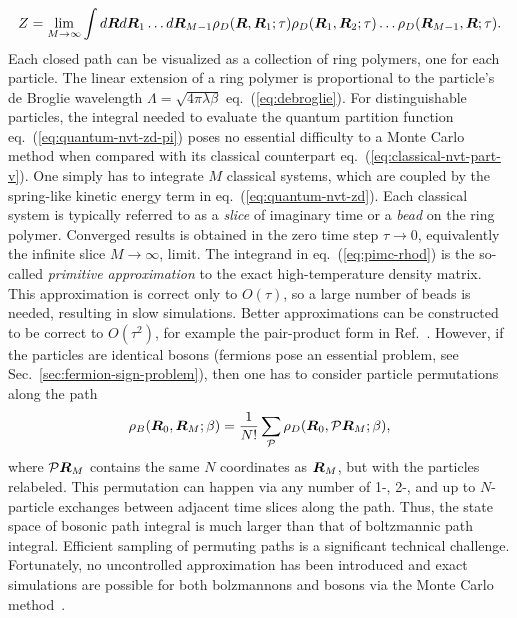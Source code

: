 \begin{align} \label{eq:quantum-nvt-zd-pi}
Z=\lim\limits_{M\rightarrow\infty} \int d\boldsymbol{R} d\boldsymbol{R}_1\dots d\boldsymbol{R}_{M-1}
\rho_D(\boldsymbol{R},\boldsymbol{R}_1;\tau)\rho_D(\boldsymbol{R}_1,\boldsymbol{R}_2;\tau)\dots\rho_D(\boldsymbol{R}_{M-1},\boldsymbol{R};\tau).
\end{align}
Each closed path can be visualized as a collection of ring polymers, one for each particle. The linear extension of a ring polymer is proportional to the particle's de Broglie wavelength $\Lambda=\sqrt{4\pi\lambda\beta}$ eq.~(\ref{eq:debroglie}).
For distinguishable particles, the integral needed to evaluate the quantum partition function eq.~(\ref{eq:quantum-nvt-zd-pi}) poses no essential difficulty to a Monte Carlo method when compared with its classical counterpart eq.~(\ref{eq:classical-nvt-part-v}).
One simply has to integrate $M$ classical systems, which are coupled by the spring-like kinetic energy term in eq.~(\ref{eq:quantum-nvt-zd}).
Each classical system is typically referred to as a \emph{slice} of imaginary time or a \emph{bead} on the ring polymer.
Converged results is obtained in the zero time step $\tau\rightarrow0$, equivalently the infinite slice $M\rightarrow\infty$, limit.
The integrand in eq.~(\ref{eq:pimc-rhod}) is the so-called \emph{primitive approximation} to the exact high-temperature density matrix.
This approximation is correct only to $O(\tau)$, so a large number of beads is needed, resulting in slow simulations.
Better approximations can be constructed to be correct to $O(\tau^2)$, for example the pair-product form in Ref.~\cite{Ceperley1995}.
However, if the particles are identical bosons (fermions pose an essential problem, see Sec.~\ref{sec:fermion-sign-problem}), then one has to consider particle permutations along the path
\begin{align}
\rho_B(\boldsymbol{R}_0,\boldsymbol{R}_M;\beta) = \frac{1}{N!}\sum\limits_{\mathcal{P}} \rho_D(\boldsymbol{R}_0, \mathcal{P}\boldsymbol{R}_M;\beta),
\end{align}
where $\mathcal{P}\boldsymbol{R}_M$ contains the same $N$ coordinates as $\boldsymbol{R}_M$, but with the particles relabeled. This permutation can happen via any number of 1-, 2-, and up to $N$-particle exchanges between adjacent time slices along the path. Thus, the state space of bosonic path integral is much larger than that of boltzmannic path integral. Efficient sampling of permuting paths is a significant technical challenge. Fortunately, no uncontrolled approximation has been introduced and exact simulations are possible for both bolzmannons and bosons via the Monte Carlo method~\cite{Ceperley1995,Meldgin2016}.

